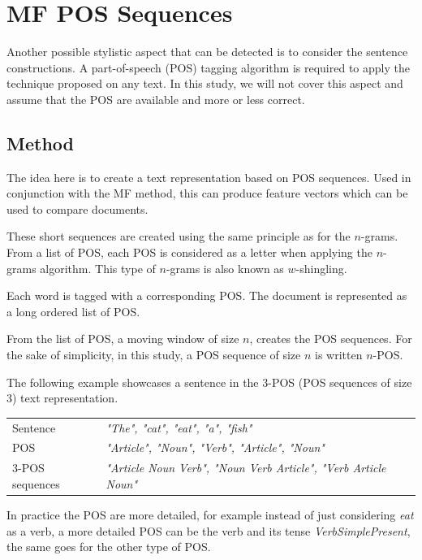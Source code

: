 \section{MF POS Sequences \label{sec:pos_sequences}}

Another possible stylistic aspect that can be detected is to consider the sentence constructions.
A part-of-speech (POS) tagging algorithm is required to apply the technique proposed on any text.
In this study, we will not cover this aspect and assume that the POS are available and more or less correct.

\subsection{Method}

The idea here is to create a text representation based on POS sequences.
Used in conjunction with the MF method, this can produce feature vectors which can be used to compare documents.

These short sequences are created using the same principle as for the $n$-grams.
From a list of POS, each POS is considered as a letter when applying the $n$-grams algorithm.
This type of $n$-grams is also known as $w$-shingling.

\begin{definition}
  Each word is tagged with a corresponding POS.
  The document is represented as a long ordered list of POS.

  From the list of POS, a moving window of size $n$, creates the POS sequences.
  For the sake of simplicity, in this study, a POS sequence of size $n$ is written $n$-POS.

  The following example showcases a sentence in the 3-POS (POS sequences of size 3) text representation.

  \vspace{0.2cm}

  \begin{tabular}{l p{5cm}}
      \toprule
      Sentence & \textit{"The", "cat", "eat", "a", "fish"} \\
      POS & \textit{"Article", "Noun", "Verb", "Article", "Noun"} \\
      \midrule
      3-POS sequences & \textit{"Article Noun Verb", "Noun Verb Article", "Verb Article Noun"} \\
      \bottomrule
  \end{tabular}

  \vspace{0.2cm}

  In practice the POS are more detailed, for example instead of just considering \textit{eat} as a verb, a more detailed POS can be the verb and its tense \textit{VerbSimplePresent}, the same goes for the other type of POS.
\end{definition}


